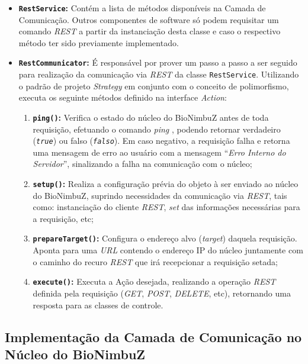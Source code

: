 \begin{itemize}
	\item \textbf{\texttt{RestService}:} Contém a lista de métodos disponíveis na Camada de Comunicação. Outros componentes de software só podem requisitar um comando \textit{REST} a partir da instanciação desta classe e caso o respectivo método ter sido previamente implementado.
	\item \textbf{\texttt{RestCommunicator}:} É responsável por prover um passo a passo a ser seguido para realização da comunicação via \textit{REST} da classe \texttt{RestService}. Utilizando o padrão de projeto \textit{Strategy} \cite{head_first_book} em conjunto com o conceito de polimorfismo, executa os seguinte métodos definido na interface \textit{Action}:
	\begin{enumerate}
		\item \textbf{\texttt{ping()}:} Verifica o estado do núcleo do BioNimbuZ antes de toda requisição, efetuando o comando \textit{ping} \cite{ping_rfc}, podendo retornar verdadeiro (\texttt{\textit{true}}) ou falso (\texttt{\textit{falso}}). Em caso negativo, a requisição falha e retorna uma mensagem de erro ao usuário com a mensagem ``\textit{Erro Interno do Servidor}'', sinalizando a falha na comunicação com o núcleo;
		\item \textbf{\texttt{setup()}:} Realiza a configuração prévia do objeto à ser enviado ao núcleo do BioNimbuZ, suprindo necessidades da comunicação via \textit{REST}, tais como: instanciação do cliente \textit{REST}, \textit{set} das informações necessárias para a requisição, etc;
		\item \textbf{\texttt{prepareTarget()}:} Configura o endereço alvo (\textit{target}) daquela requisição. Aponta para uma \textit{URL} contendo o endereço IP do núcleo juntamente com o caminho do recuro \textit{REST} \cite{rest} que irá recepcionar a requisição setada;
		\item \textbf{\texttt{execute()}:} Executa a Ação desejada, realizando a operação \textit{REST} definida pela requisição (\textit{GET}, \textit{POST}, \textit{DELETE}, etc), retornando uma resposta para as classes de controle.
	\end{enumerate}
\end{itemize}

\subsection{Implementação da Camada de Comunicação no Núcleo do BioNimbuZ} \label{cap5sec5subsec2}

